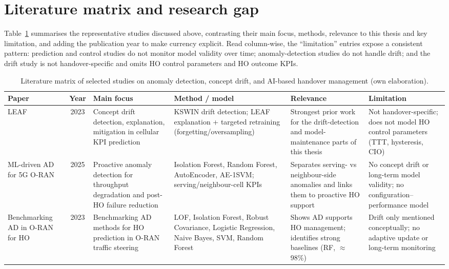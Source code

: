 \section{Literature matrix and research gap}
\label{subsec:rw-matrix}

Table~\ref{tab:litmatrix} summarises the representative studies discussed above,
contrasting their main focus, methods, relevance to this thesis and key
limitation, and adding the publication year to make currency explicit. Read
column-wise, the ``limitation'' entries expose a consistent pattern: prediction
and control studies do not monitor model validity over time; anomaly-detection
studies do not handle drift; and the drift study is not handover-specific and
omits HO control parameters and HO outcome KPIs.

\begin{table}[p]
\centering
\scriptsize
\renewcommand{\arraystretch}{1.25}
\caption{Literature matrix of selected studies on anomaly detection, concept drift, and AI-based handover management (own elaboration).}
\label{tab:litmatrix}
\begin{tabular}{@{}p{2.1cm}cp{2.0cm}p{2.2cm}p{2.5cm}p{2.4cm}@{}}
\toprule
Paper & Year & Main focus & Method / model & Relevance & Limitation \\
\midrule
LEAF~\cite{leaf} & 2023 &
Concept drift detection, explanation, mitigation in cellular KPI prediction &
KSWIN drift detection; LEAF explanation + targeted retraining (forgetting/oversampling) &
Strongest prior work for the drift-detection and model-maintenance parts of this thesis &
Not handover-specific; does not model HO control parameters (TTT, hysteresis, CIO) \\

ML-driven AD for 5G O-RAN~\cite{oranAnomaly2025} & 2025 &
Proactive anomaly detection for throughput degradation and post-HO failure reduction &
Isolation Forest, Random Forest, AutoEncoder, AE-1SVM; serving/neighbour-cell KPIs &
Separates serving- vs neighbour-side anomalies and links them to proactive HO support &
No concept drift or long-term model validity; no configuration--performance model \\

Benchmarking AD in O-RAN for HO~\cite{oranBenchmark2023} & 2023 &
Benchmarking AD methods for HO prediction in O-RAN traffic steering &
LOF, Isolation Forest, Robust Covariance, Logistic Regression, Naive Bayes, SVM, Random Forest &
Shows AD supports HO management; identifies strong baselines (RF, $\approx$98\%) &
Drift only mentioned conceptually; no adaptive update or long-term monitoring \\


\end{tabular}
\end{table}
